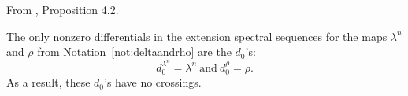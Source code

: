 \begin{proposition}
\label{paper:4.2}
From \cite{LWX126}, Proposition 4.2.\par
\label{prop:9770ae6e} 
The only nonzero differentials in the extension spectral sequences for the maps $\lambda^n$ and $\rho$ from Notation~\ref{not:deltaandrho} are the $d_0$'s:
$$d^{\lambda^n}_0=\lambda^n \ \text{and} \ d^{\rho}_0=\rho.$$ 
As a result, these $d_0$'s have no crossings.




\end{proposition}
